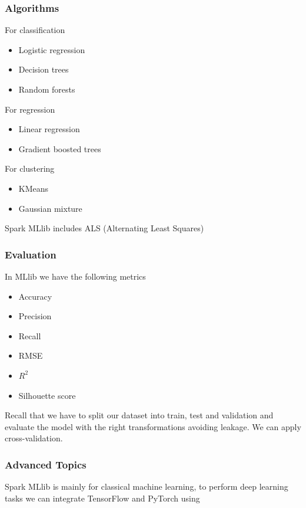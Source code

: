 \subsubsection{Algorithms}

For classification
\begin{itemize}
    \item Logistic regression
    \item Decision trees
    \item Random forests
\end{itemize}

For regression
\begin{itemize}
    \item Linear regression
    \item Gradient boosted trees
\end{itemize}

For clustering
\begin{itemize}
    \item KMeans
    \item Gaussian mixture
\end{itemize}

Spark MLlib includes ALS (Alternating Least Squares)

\subsubsection{Evaluation}

In MLlib we have the following metrics

\begin{itemize}
    \item Accuracy
    \item Precision
    \item Recall
    \item RMSE
    \item $R^2$
    \item Silhouette score 
\end{itemize}

Recall that we have to split our dataset into train, test and validation and evaluate the model with the right transformations avoiding leakage. We can apply cross-validation.

\subsubsection{Advanced Topics}

Spark MLlib is mainly for classical machine learning, to perform deep learning tasks we can integrate TensorFlow and PyTorch using 


